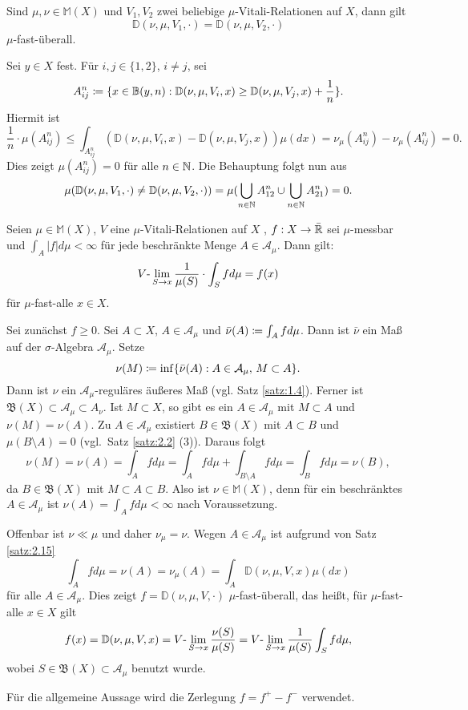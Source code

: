 \documentclass[a4paper,twoside,DIV15,BCOR12mm]{scrbook}
\newcommand{\A}{\mathcal A}
\newcommand{\borel}{\mathfrak B}
\begin{document}
\begin{satz}
\label{satz:2.16}
Sind $\mu,\nu\in\mathbb M(X)$ und $V_1,V_2$ zwei beliebige $\mu$-Vitali-Relationen auf $X$, dann gilt
\[
\mathbb D(\nu,\mu,V_1,\cdot) = \mathbb D(\nu,\mu,V_2,\cdot)
\]
$\mu$-fast-überall.
\end{satz}

\begin{beweis}
Sei $y\in X$ fest. Für $i,j\in\{1,2\}$, $i\ne j$, sei
\[
A_{ij}^n \da \{x\in \mathbb B(y,n): \mathbb D(\nu,\mu,V_i,x) \ge \mathbb D(\nu,\mu,V_j,x) + \frac1n\}.
\]
Hiermit ist
\[
\frac 1n\cdot \mu(A_{ij}^n) \le \int_{A_{ij}^n}(\mathbb D(\nu,\mu,V_i,x) - \mathbb D(\nu,\mu,V_j,x)) \mu(dx) = \nu_\mu(A_{ij}^n) - \nu_\mu(A_{ij}^n) = 0.
\]
Dies zeigt $\mu(A_{ij}^n)=0$ für alle $n\in\mathbb{N}$. Die Behauptung folgt nun aus 
\[
\mu(\mathbb D(\nu,\mu,V_1,\cdot) \ne \mathbb D(\nu,\mu,V_2,\cdot)) =  \mu(\bigcup_{n\in\mathbb{N}} A_{12}^n \cup \bigcup_{n\in\mathbb{N}} A_{21}^n) = 0.
\]
\end{beweis}

\begin{satz}
\label{satz:2.17}
Seien $\mu\in\mathbb M(X)$, $V$ eine $\mu$-Vitali-Relationen auf $X$ , $f:X\to\bar{\mathbb{R}}$ sei $\mu$-messbar und $\int_A |f|d\mu <\infty$ für jede beschränkte Menge $A\in\A_\mu$. Dann gilt:
\[
V\text-\lim_{S\to x} \frac1{\mu(S)} \cdot \int_S fd\mu = f(x)
\]
für $\mu$-fast-alle $x\in X$.
\end{satz}

\begin{beweis}
Sei zunächst $f\ge 0$. Sei $A\subset X$, $A\in \mathcal{A}_\mu$ und $\bar\nu(A) \da \int_A fd\mu$. Dann ist $\bar\nu$ ein Maß auf der $\sigma$-Algebra $\mathcal{A}_\mu$. Setze
\[
\nu(M) \da \inf\{\bar\nu(A):  A\in \A_\mu,\, M\subset A \}.
\]
Dann ist $\nu$ ein $\A_\mu$-reguläres äußeres Maß (vgl. Satz \ref{satz:1.4}). Ferner ist $\borel(X) \subset \A_\mu \subset A_\nu$. Ist $M\subset X$, so gibt es ein $A\in \A_\mu$ mit $M\subset A$ und $\nu(M)=\nu(A)$. Zu $A\in \A_\mu$ existiert $B\in\borel(X)$ mit $A\subset B$ und $\mu(B\setminus A)=0$ (vgl.\ Satz \ref{satz:2.2} (3)). Daraus folgt
\[
\nu(M) = \nu(A) = \int_Afd\mu = \int_A fd\mu + \int_{B\setminus A} fd\mu = \int_B fd\mu = \nu(B),
\]
da $B\in\borel(X)$ mit $M\subset A \subset B$. Also ist $\nu\in\mathbb M(X)$, denn für ein beschränktes $A\in\A_\mu$ ist $\nu(A) = \int_A fd\mu < \infty$ nach Voraussetzung.

Offenbar ist $\nu \ll \mu$ und daher $\nu_\mu = \nu$. Wegen $A\in\A_\mu$ ist aufgrund von Satz \ref{satz:2.15}
\[
\int_A fd\mu = \nu(A) = \nu_\mu(A) = \int_A \mathbb D(\nu,\mu,V,x)\mu(dx)
\]
für alle $A\in\A_\mu$. Dies zeigt $f = \mathbb D(\nu,\mu,V,\cdot)$ $\mu$-fast-überall, das heißt, für $\mu$-fast-alle $x\in X$ gilt
\[
f(x) = \mathbb D(\nu,\mu,V,x) = V\text-\lim_{S\to x} \frac{\nu(S)}{\mu(S)} =  V\text-\lim_{S\to x} \frac1{\mu(S)} \int_S fd\mu,
\]
wobei $S\in\borel(X)\subset\mathcal{A}_\mu$ benutzt wurde.

Für die allgemeine Aussage wird die Zerlegung $f=f^+-f^-$ verwendet.
\end{beweis}
\end{document}
